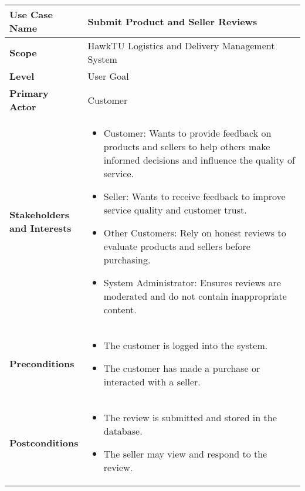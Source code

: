 \documentclass{article}
\begin{document}
\begin{longtable}{|>{\raggedright\arraybackslash}m{0.25\linewidth}|m{0.75\linewidth}|}
\hline
\textbf{Use Case Name} & Submit Product and Seller Reviews \\
\hline
\textbf{Scope} & HawkTU Logistics and Delivery Management System \\
\hline
\textbf{Level} & User Goal \\
\hline
\textbf{Primary Actor} & Customer \\
\hline
\textbf{Stakeholders and Interests} & 
\begin{itemize}
    \item Customer: Wants to provide feedback on products and sellers to help others make informed decisions and influence the quality of service.
    \item Seller: Wants to receive feedback to improve service quality and customer trust.
    \item Other Customers: Rely on honest reviews to evaluate products and sellers before purchasing.
    \item System Administrator: Ensures reviews are moderated and do not contain inappropriate content.
\end{itemize} \\
\hline
\textbf{Preconditions} & 
\begin{itemize}
    \item The customer is logged into the system.
    \item The customer has made a purchase or interacted with a seller.
\end{itemize} \\
\hline
\textbf{Postconditions} & 
\begin{itemize}
    \item The review is submitted and stored in the database.
    \item The seller may view and respond to the review.
\end{itemize} \\
\hline
\end{longtable}

\vspace{-2.45em}
\end{document}
